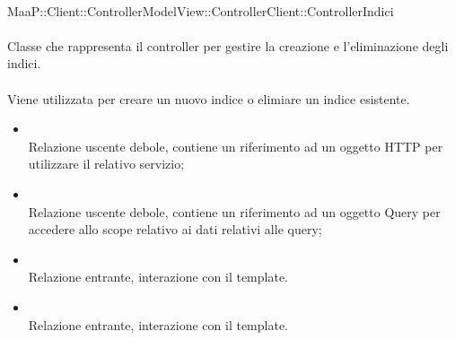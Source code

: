 	\\
	MaaP::Client::ControllerModelView::ControllerClient::ControllerIndici\\
	\\
	Classe che rappresenta il controller per gestire la creazione e l'eliminazione degli indici.\\
	\\
	Viene utilizzata per creare un nuovo indice o elimiare un indice esistente.\\
	\begin{itemize}
	\item{}\\
	Relazione uscente debole, contiene un riferimento ad un oggetto HTTP per utilizzare il relativo servizio;
	\item{}\\
	Relazione uscente debole, contiene un riferimento ad un oggetto Query per accedere allo scope relativo ai dati relativi alle query;
	\item{}\\
	Relazione entrante, interazione con il template.
	\item{}\\
	Relazione entrante, interazione con il template.
	\end{itemize}
	
